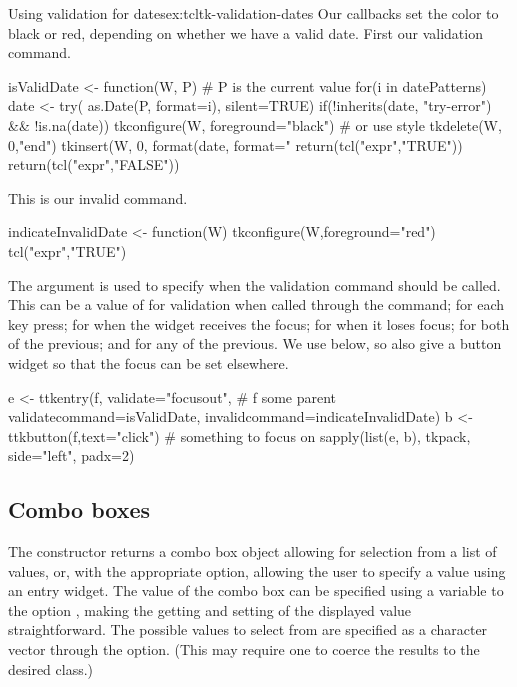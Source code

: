 \begin{example}{Using validation for dates}{ex:tcltk-validation-dates}
Our callbacks set the color to black or red, depending on whether we
have a valid date. First our validation command.
\begin{Schunk}
\begin{Sinput}
 isValidDate <- function(W, P) { # P is the current value
   for(i in datePatterns) {
     date <- try( as.Date(P, format=i), silent=TRUE)
     if(!inherits(date, "try-error") && !is.na(date)) {
       tkconfigure(W, foreground="black")  # or use style
       tkdelete(W, 0,"end")
       tkinsert(W, 0, format(date, format="%
       return(tcl("expr","TRUE"))        
     } 
   }
   return(tcl("expr","FALSE"))
 }
\end{Sinput}
\end{Schunk}

This is our invalid command.
\begin{Schunk}
\begin{Sinput}
 indicateInvalidDate <- function(W) {
   tkconfigure(W,foreground="red")
   tcl("expr","TRUE")
 }
\end{Sinput}
\end{Schunk}


The  argument is used to specify when the
validation command should be called. This can be a value of
 for validation when called through the 
command;  for each key press;  for when the
widget receives the focus;  for when it loses focus;
 for both of the previous; and  for any of the
previous. We use  below, so also give a button widget
so that the focus can be set elsewhere. 
\begin{Schunk}
\begin{Sinput}
 e <- ttkentry(f, validate="focusout", # f some parent
               validatecommand=isValidDate,
               invalidcommand=indicateInvalidDate)
 b <- ttkbutton(f,text="click")        # something to focus on
 sapply(list(e, b), tkpack, side="left", padx=2)
\end{Sinput}
\end{Schunk}
              
\end{example}


\subsection{Combo boxes}
\label{sec:tcltk:comboboxes}

The  constructor returns a combo box object
allowing for selection from a list of values, or, with the appropriate
option, allowing the user to specify a value using an entry
widget. The value of the combo box can be specified using a \TCL\/
variable to the option , making the
getting and setting of the displayed value straightforward. The
possible values to select from are specified as a character vector
through the  option. (This may require one
to coerce the results to the desired class.)

